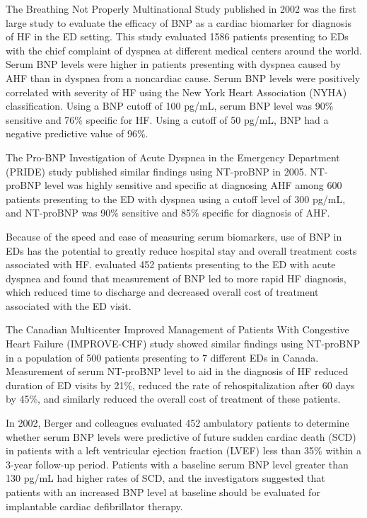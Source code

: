 \documentclass[14pt,a4paper,onecolumn]{extarticle}
\begin{document}
The Breathing Not Properly Multinational Study published in 2002 was the first large study to evaluate the efficacy of BNP as a cardiac biomarker for diagnosis of HF in the ED setting. This study evaluated 1586 patients presenting to EDs with the chief complaint of dyspnea at different medical centers around the world. Serum BNP levels were higher in patients presenting with dyspnea caused by AHF than in dyspnea from a noncardiac cause. Serum BNP levels were positively correlated with severity of HF using the New York Heart Association (NYHA) classification. Using a BNP cutoff of 100 pg/mL, serum BNP level was 90\% sensitive and 76\% specific for HF. Using a cutoff of 50 pg/mL, BNP had a negative predictive value of 96\%. \citep{Maisel2002} %

The Pro-BNP Investigation of Acute Dyspnea in the Emergency Department (PRIDE) study published similar findings using NT-proBNP in 2005. NT-proBNP level was highly sensitive and specific at diagnosing AHF among 600 patients presenting to the ED with dyspnea using a cutoff level of 300 pg/mL, and NT-proBNP was 90\% sensitive and 85\% specific for diagnosis of AHF. \citep{Januzzi2005}  %

Because of the speed and ease of measuring serum biomarkers, use of BNP in EDs has the potential to greatly reduce hospital stay and overall treatment costs associated with HF. \citep{Mueller2004} evaluated 452 patients presenting to the ED with acute dyspnea and found that measurement of BNP led to more rapid HF diagnosis, which reduced time to discharge and decreased overall cost of treatment associated with the ED visit.  %

The Canadian Multicenter Improved Management of Patients With Congestive Heart Failure (IMPROVE-CHF) study showed similar findings using NT-proBNP in a population of 500 patients presenting to 7 different EDs in Canada. Measurement of serum NT-proBNP level to aid in the diagnosis of HF reduced duration of ED visits by 21\%, reduced the rate of rehospitalization after 60 days by 45\%, and similarly reduced the overall cost of treatment of these patients. \citep{Moe2007} %

In 2002, Berger and colleagues  evaluated 452 ambulatory patients to determine whether serum BNP levels were predictive of future sudden cardiac death (SCD) in patients with a left ventricular ejection fraction (LVEF) less than 35\% within a 3-year follow-up period. Patients with a baseline serum BNP level greater than 130 pg/mL had higher rates of SCD, and the investigators suggested that patients with an increased BNP level at baseline should be evaluated for implantable cardiac defibrillator therapy. \citep{Berger2002} %
\end{document}
